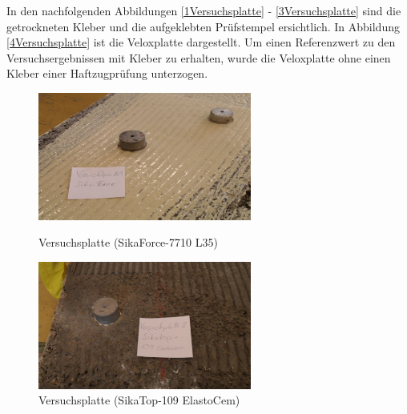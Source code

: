 In den nachfolgenden Abbildungen \ref{1Versuchsplatte} - \ref{3Versuchsplatte} sind die getrockneten Kleber und die aufgeklebten Prüfstempel ersichtlich. In Abbildung \ref{4Versuchsplatte} ist die Veloxplatte dargestellt. Um einen Referenzwert zu den Versuchsergebnissen mit Kleber zu erhalten, wurde  die Veloxplatte ohne einen Kleber einer Haftzugprüfung unterzogen.

\begin{figure}[h]
\begin{minipage}[hbt]{7cm}	
	\includegraphics[width=7cm]{Verbindungsmittel/kleber/1Versuchsplatte.jpg}
	\caption{Versuchsplatte (SikaForce-7710 L35)}
	\label{1Versuchsplatte}
\end{minipage}
\hfill
\begin{minipage}[hbt]{7cm}
	\includegraphics[width=7cm]{Verbindungsmittel/kleber/2Versuchsplatte.jpg}
	\caption{Versuchsplatte (SikaTop-109 ElastoCem)}
	\label{2Versuchsplatte}
\end{minipage}
\end{figure}


